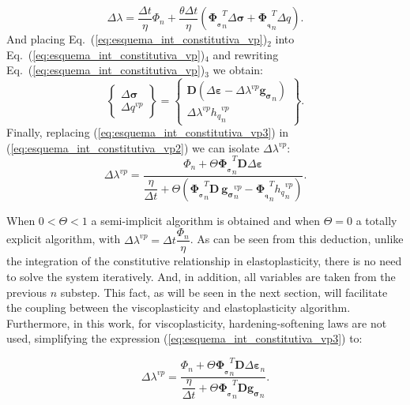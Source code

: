 \documentclass[Journal,letterpaper]{ascelike-new}
\newcommand{\dgds}{\boldsymbol{g_\sigma}}
\newcommand{\dPhidsl}{\boldsymbol{\Phi_{_\sigma}}}
\newcommand{\dPhidql}{\boldsymbol{\Phi_{_q}}}
\newcommand{\Dsdee}{\boldsymbol{D}}
\newcommand{\hl}{{h_q}}
\newcommand{\strain}{\boldsymbol{\varepsilon}}
\newcommand{\stress}{\boldsymbol{\sigma}}
\begin{document}
\begin{equation}
	\label{eq:esquema_int_constitutiva_vp2}
	\Delta \lambda = \dfrac{\Delta t}{\eta} \Phi_n + \dfrac{\theta \Delta t}{\eta}(\dPhidsl_n^T \Delta \stress + \dPhidql_n^T \Delta q).
\end{equation}
And placing Eq.~(\ref{eq:esquema_int_constitutiva_vp})$_2$  into Eq.~(\ref{eq:esquema_int_constitutiva_vp})$_4$ and rewriting 
Eq.~(\ref{eq:esquema_int_constitutiva_vp})$_3$ we obtain:
\begin{equation}
	\label{eq:esquema_int_constitutiva_vp3}
	\left\{ \begin{array}{lcl} \Delta \stress \\ \Delta q^{vp} \end{array} \right\} = \left\{ \begin{array}{ccc} \Dsdee(\Delta\strain -\Delta \lambda^{vp} \dgds_n) \\ \Delta \lambda^{vp} \hl_n^{vp} \end{array} \right\}.
\end{equation}
Finally, replacing (\ref{eq:esquema_int_constitutiva_vp3}) in (\ref{eq:esquema_int_constitutiva_vp2}) we can isolate $\Delta \lambda^{vp}$:
\begin{equation}
	\label{eq:esquema_int_constitutiva_vp4}
	\Delta \lambda^{vp} = \dfrac{\Phi_n + \Theta \dPhidsl_n^T\Dsdee\Delta\strain}{\dfrac{\eta}{\Delta t} + \Theta (\dPhidsl_n^T\Dsdee~\dgds_n^{vp} - \dPhidql_n^T \hl_n^{vp})}.
\end{equation}

When $0 < \Theta < 1$ a semi-implicit algorithm is obtained and when $\Theta = 0$ a totally explicit algorithm, with $\Delta \lambda^{vp} = \Delta t \dfrac{\Phi_n}{\eta}$. As can be seen from this deduction, unlike the integration of the constitutive relationship in elastoplasticity, there is no need to solve the system iteratively. And, in addition, all variables are taken from the previous $n$ substep. This fact, as will be seen in the next section, will facilitate the coupling between the viscoplasticity and elastoplasticity algorithm. Furthermore, in this work, for viscoplasticity, hardening-softening laws are not used, simplifying the expression (\ref{eq:esquema_int_constitutiva_vp3}) to:

\begin{equation}
	\label{eq:esquema_int_constitutiva_vp5}
	\Delta \lambda^{vp} = \dfrac{\Phi_n + \Theta \dPhidsl_n^T\Dsdee\Delta\strain_n}{\dfrac{\eta}{\Delta t} + \Theta \dPhidsl_n^T\Dsdee\dgds_n}.
\end{equation}
\end{document}
